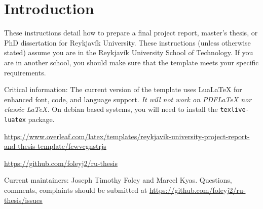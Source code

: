 
\newcommand{\TIheadofgrad}{TBA}
\newcommand{\TItvdadmin}{Sigrún Þorgeirsdóttir~\formatemail{sigrunth}}

\section{Introduction} %
These instructions detail how to prepare a final project report, master's thesis, or PhD dissertation for Reykjavík University.
These instructions (unless otherwise stated) assume you are in the Reykjavík University School of Technology.
If you are in another school, you should make sure that the template meets your specific requirements.

Critical information:  The current version of the template uses Lua\LaTeX{} for enhanced font, code, and language support.
{\em It will not work on PDF\LaTeX{} nor classic \LaTeX.}
On debian based systems, you will need to install the \verb|texlive-luatex| package.

\begin{description}
\item [Overleaf Template:]  \url{https://www.overleaf.com/latex/templates/reykjavik-university-project-report-and-thesis-template/fcwvcgnstrjs}
\item [Actively developed code:] \url{https://github.com/foleyj2/ru-thesis}
\item Current maintainers: Joseph Timothy Foley and Marcel Kyas.
  Questions, comments, complaints should be submitted at \url{https://github.com/foleyj2/ru-thesis/issues}
\end{description}

